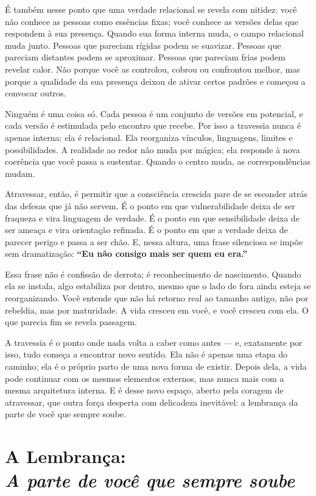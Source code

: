\documentclass[12pt]{book}
\begin{document}
É também nesse ponto que uma verdade relacional se revela com nitidez: você não conhece as pessoas como essências fixas; você conhece as versões delas que respondem à sua presença. Quando sua forma interna muda, o campo relacional muda junto. Pessoas que pareciam rígidas podem se suavizar. Pessoas que pareciam distantes podem se aproximar. Pessoas que pareciam frias podem revelar calor. Não porque você as controlou, cobrou ou confrontou melhor, mas porque a qualidade da sua presença deixou de ativar certos padrões e começou a convocar outros.

Ninguém é uma coisa só. Cada pessoa é um conjunto de versões em potencial, e cada versão é estimulada pelo encontro que recebe. Por isso a travessia nunca é apenas interna: ela é relacional. Ela reorganiza vínculos, linguagens, limites e possibilidades. A realidade ao redor não muda por mágica; ela responde à nova coerência que você passa a sustentar. Quando o centro muda, as correspondências mudam.

Atravessar, então, é permitir que a consciência crescida pare de se esconder atrás das defesas que já não servem. É o ponto em que vulnerabilidade deixa de ser fraqueza e vira linguagem de verdade. É o ponto em que sensibilidade deixa de ser ameaça e vira orientação refinada. É o ponto em que a verdade deixa de parecer perigo e passa a ser chão. E, nessa altura, uma frase silenciosa se impõe sem dramatização: \textbf{“Eu não consigo mais ser quem eu era.”}

Essa frase não é confissão de derrota; é reconhecimento de nascimento. Quando ela se instala, algo estabiliza por dentro, mesmo que o lado de fora ainda esteja se reorganizando. Você entende que não há retorno real ao tamanho antigo, não por rebeldia, mas por maturidade. A vida cresceu em você, e você cresceu com ela. O que parecia fim se revela passagem.

A travessia é o ponto onde nada volta a caber como antes — e, exatamente por isso, tudo começa a encontrar novo sentido. Ela não é apenas uma etapa do caminho; ela é o próprio parto de uma nova forma de existir. Depois dela, a vida pode continuar com os mesmos elementos externos, mas nunca mais com a mesma arquitetura interna. E é desse novo espaço, aberto pela coragem de atravessar, que outra força desperta com delicadeza inevitável: a lembrança da parte de você que sempre soube.

\chapter[A Lembrança: A parte de você que sempre soube]{A Lembrança:\\[0.4ex]\large\itshape A parte de você que sempre soube}
\end{document}
